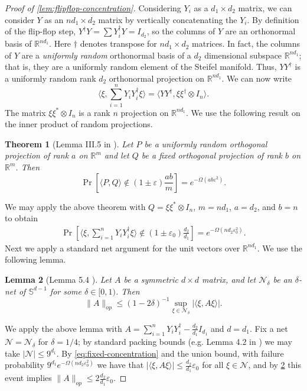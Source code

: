 \documentclass[aos]{imsart}
\newtheorem{theorem}{Theorem}[section]
\newtheorem{lemma}[theorem]{Lemma}
\theoremstyle{definition}
\numberwithin{equation}{section}
\newcommand{\R}{{\mathbb{R}}}
\renewcommand{\S}{\mathbb{S}}
\newcommand{\ot}{\otimes}
\newcommand{\eps}{\varepsilon}
\begin{document}
\begin{appendix}
\begin{proof}[Proof of \cref{lem:flipflop-concentration}]
 Considering $Y_i$ as a $d_1 \times d_2$ matrix, we can consider $Y$ as an $n d_1 \times d_2$ matrix by vertically concatenating the $Y_i$. By definition of the flip-flop step, $Y^\dagger Y = \sum Y_i^\dagger Y = I_{d_2}$, so the columns of $Y$ are an orthonormal basis of $\R^{n d_1}$. Here $\dagger$ denotes transpose for $nd_1 \times d_2$ matrices. In fact, the columns of $Y$ are a \emph{uniformly random} orthonormal basis of a $d_2$ dimensional subspace $\R^{n d_1}$; that is, they are a uniformly random element of the Steifel manifold. Thus, $Y Y^\dagger$ is a uniformly random rank $d_2$ orthonormal projection on $\R^{n d_1}$. We can now write
 $$ \langle \xi,  \sum_{i = 1}^n Y_i Y_i^{\dagger} \xi \rangle = \langle YY^\dagger,  \xi \xi^\dagger \ot I_{n} \rangle.$$
The matrix $\xi \xi^{*} \otimes I_{n}$ is a rank $n$ projection on $\R^{n d_1}$. We use the following result on the inner product of random projections.

\begin{theorem} [Lemma III.5 in \cite{hayden2006aspects}] Let $P$ be a uniformly random orthogonal projection of rank $a$ on $\R^{m}$ and let $Q$ be a fixed orthogonal projection of rank $b$ on $\R^{m}$. Then
\[ \Pr \left[ \langle P, Q \rangle \not\in (1 \pm \eps) \frac{ab}{m} \right] = e^{ - \Omega( ab \eps^{2} ) }.  \]
\end{theorem}
We may apply the above theorem with $Q = \xi \xi^{*} \otimes I_{n}$, $m = n d_1$, $a = d_2$, and $b = n$ to obtain
\begin{gather}\Pr\left[ \langle \xi,  \sum_{i = 1}^n Y_i Y_i^{\dagger} \xi \rangle \not\in (1 \pm \eps_0) \frac{d_2}{ d_1} \right] = e^{ - \Omega( n d_2 \eps_0^{2} ) }. \label{eq:fixed-concentration} \end{gather}
Next we apply a standard net argument for the unit vectors over $\R^{nd_1}$. We use the following lemma.
\begin{lemma}[Lemma 5.4 \cite{vershynin2010introduction}]\label{lem:versh-net} Let $A$ be a symmetric $d\times d$ matrix, and let $\mathcal{N}_\delta$ be an $\delta$-net of $\S^{d-1}$ for some $\delta \in [0,1)$. Then
$$\|A\|_{op} \leq (1 - 2 \delta)^{-1} \sup_{\xi \in \mathcal{N}_\delta} | \langle \xi, A \xi \rangle|.$$
\end{lemma}
We apply the above lemma with $A = \sum_{i = 1}^n Y_i Y_i^{\dagger} - \frac{d_2}{d_1} I_{d_1}$ and $d = d_1$.
Fix a net $\mathcal{N} = \mathcal{N}_\delta$ for $\delta = 1/4$; by standard packing bounds (e.g. Lemma 4.2 in \cite{vershynin2010introduction}) we may take $|\mathcal{N}| \leq 9^{d_1}$. By \cref{eq:fixed-concentration} and the union bound, with failure probability $9^{d_1} e^{- \Omega (n d_2 \eps_0^2)}$ we have that $|\langle \xi , A \xi \rangle| \leq \frac{d_2}{d_1} \eps_0$ for all $\xi \in \mathcal{N}$, and by \cref{lem:versh-net} this event implies $\|A\|_{op} \leq 2  \frac{d_2}{d_1} \eps_0$.


\end{proof}
\end{appendix}
\end{document}
